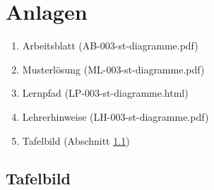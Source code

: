 \documentclass[11pt,a4paper]{article}
\begin{document}
\section{Anlagen}

\begin{enumerate}
    \item Arbeitsblatt (AB-003-st-diagramme.pdf)
    \item Musterlösung (ML-003-st-diagramme.pdf)
    \item Lernpfad (LP-003-st-diagramme.html)
    \item Lehrerhinweise (LH-003-st-diagramme.pdf)
    \item Tafelbild (Abschnitt \ref{sec:tafelbild})
\end{enumerate}

\subsection{Tafelbild}\label{sec:tafelbild}
\end{document}
